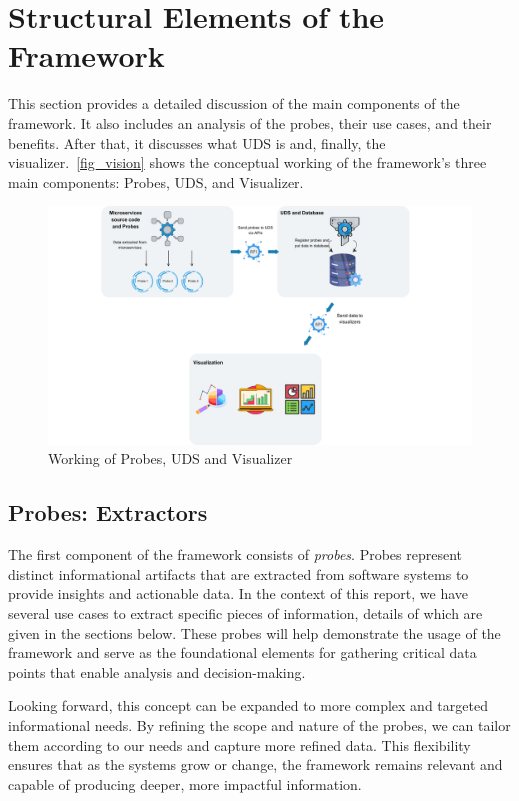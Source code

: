 \section{Structural Elements of the Framework}\label{sec:tech-strategy}

This section provides a detailed discussion of the main components of the framework. It also includes an analysis of the probes, their use cases, and their benefits. After that, it discusses what UDS is and, finally, the visualizer.~\autoref{fig_vision} shows the conceptual working of the framework's three main components: Probes, UDS, and Visualizer.

\begin{figure}[H]
    \centering
    \includegraphics[width=0.6\linewidth]{figures/vision.png}
    \caption{Working of Probes, UDS and Visualizer}
	\label{fig_vision}
\end{figure}

\subsection{Probes: Extractors}\label{sec:component-probes}

The first component of the framework consists of \textit{probes}. Probes represent distinct informational artifacts that are extracted from software systems to provide insights and actionable data. In the context of this report, we have several use cases to extract specific pieces of information, details of which are given in the sections below. These probes will help demonstrate the usage of the framework and serve as the foundational elements for gathering critical data points that enable analysis and decision-making. 

Looking forward, this concept can be expanded to more complex and targeted informational needs. By refining the scope and nature of the probes, we can tailor them according to our needs and capture more refined data. This flexibility ensures that as the systems grow or change, the framework remains relevant and capable of producing deeper, more impactful information.

